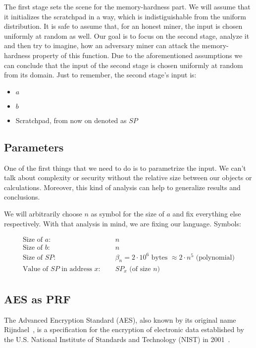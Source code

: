 The first stage sets the scene for the memory-hardness part. We will assume that it initializes the scratchpad in a way, which is indistiguishable from the uniform distribution. It is safe to assume that, for an honest miner, the input is chosen uniformly at random as well. Our goal is to focus on the second stage, analyze it and then try to imagine, how an adversary miner can attack the memory-hardness property of this function. Due to the aforementioned assumptions we can conclude that the input of the second stage is chosen uniformly at random from its domain. Just to remember, the second stage's input is:
\begin{itemize}
  \item $a$
  \item $b$
  \item Scratchpad, from now on denoted as $SP$
\end{itemize}

\subsection{Parameters}
One of the first things that we need to do is to parametrize the input. We can't talk about complexity or security without the relative size between our objects or calculations. Moreover, this kind of analysis can help to generalize results and conclusions.

We will arbitrarily choose $n$ as symbol for the size of $a$ and fix everything else respectively. With that analysis in mind, we are fixing our language. Symbols:

\[
  \begin{array}{lcl}
    \mbox{Size of }a \mbox{: } & \: & n \\
    \mbox{Size of }b \mbox{: } & \: & n \\
    \mbox{Size of }SP \mbox{: } & \: & \beta_{n} = 2 \cdot 10^{6} \mbox{ bytes } \approx 2 \cdot n^{5} \mbox{ (polynomial)} \\
    \mbox{Value of }SP \mbox{ in address }x \mbox{: } & \: & SP_{x} \mbox{ (of size }n\mbox{)} \\
  \end{array}
\]

\subsection{AES as PRF}
The Advanced Encryption Standard (AES), also known by its original name Rijndael~\cite{Daemen99aesproposal:}, is a specification for the encryption of electronic data established by the U.S. National Institute of Standards and Technology (NIST) in 2001~\cite{nla.cat-vn4183631}.

